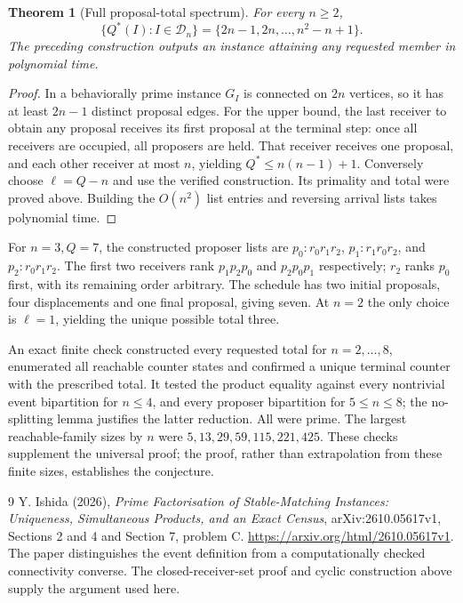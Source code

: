 \documentclass[11pt,a4paper]{article}
\newtheorem{theorem}{Theorem}[section]
\begin{document}
\begin{theorem}[Full proposal-total spectrum]
For every $n\ge2$,
\[
 \{Q^*(I):I\in\mathcal D_n\}
   =\{2n-1,2n,\ldots,n^2-n+1\}.
\]
The preceding construction outputs an instance attaining any requested member in polynomial time.
\end{theorem}
\begin{proof}
In a behaviorally prime instance $G_I$ is connected on $2n$ vertices, so it has at least $2n-1$ distinct proposal edges. For the upper bound, the last receiver to obtain any proposal receives its first proposal at the terminal step: once all receivers are occupied, all proposers are held. That receiver receives one proposal, and each other receiver at most $n$, yielding $Q^*\le n(n-1)+1$. Conversely choose $\ell=Q-n$ and use the verified construction. Its primality and total were proved above. Building the $O(n^2)$ list entries and reversing arrival lists takes polynomial time.
\end{proof}

For $n=3,Q=7$, the constructed proposer lists are
$p_0:r_0r_1r_2$, $p_1:r_1r_0r_2$, and $p_2:r_0r_1r_2$.
The first two receivers rank $p_1p_2p_0$ and $p_2p_0p_1$ respectively; $r_2$ ranks $p_0$ first, with its remaining order arbitrary. The schedule has two initial proposals, four displacements and one final proposal, giving seven. At $n=2$ the only choice is $\ell=1$, yielding the unique possible total three.

An exact finite check constructed every requested total for $n=2,\ldots,8$, enumerated all reachable counter states and confirmed a unique terminal counter with the prescribed total. It tested the product equality against every nontrivial event bipartition for $n\le4$, and every proposer bipartition for $5\le n\le8$; the no-splitting lemma justifies the latter reduction. All were prime. The largest reachable-family sizes by $n$ were $5,13,29,59,115,221,425$. These checks supplement the universal proof; the proof, rather than extrapolation from these finite sizes, establishes the conjecture.

\begin{thebibliography}{9}
 Y. Ishida (2026), \emph{Prime Factorisation of Stable-Matching Instances: Uniqueness, Simultaneous Products, and an Exact Census}, arXiv:2610.05617v1, Sections 2 and 4 and Section 7, problem C. \url{https://arxiv.org/html/2610.05617v1}. The paper distinguishes the event definition from a computationally checked connectivity converse. The closed-receiver-set proof and cyclic construction above supply the argument used here.
\end{thebibliography}
\end{document}
